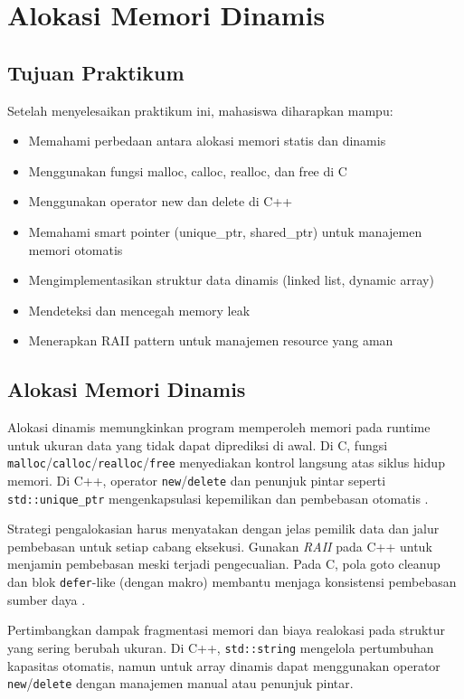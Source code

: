 \documentclass[../main.tex]{subfiles}
\begin{document}
\chapter{Alokasi Memori Dinamis}

\section*{Tujuan Praktikum}
Setelah menyelesaikan praktikum ini, mahasiswa diharapkan mampu:
\begin{itemize}
  \item Memahami perbedaan antara alokasi memori statis dan dinamis
  \item Menggunakan fungsi malloc, calloc, realloc, dan free di C
  \item Menggunakan operator new dan delete di C++
  \item Memahami smart pointer (unique\_ptr, shared\_ptr) untuk manajemen memori otomatis
  \item Mengimplementasikan struktur data dinamis (linked list, dynamic array)
  \item Mendeteksi dan mencegah memory leak
  \item Menerapkan RAII pattern untuk manajemen resource yang aman
\end{itemize}

\section{Alokasi Memori Dinamis}
Alokasi dinamis memungkinkan program memperoleh memori pada runtime untuk ukuran data yang tidak dapat diprediksi di awal. Di C, fungsi \texttt{malloc}/\texttt{calloc}/\texttt{realloc}/\texttt{free} menyediakan kontrol langsung atas siklus hidup memori. Di C++, operator \texttt{new}/\texttt{delete} dan penunjuk pintar seperti \texttt{std::unique\_ptr} mengenkapsulasi kepemilikan dan pembebasan otomatis \parencite{iso-c-draft-n1570,cpp-reference}.

Strategi pengalokasian harus menyatakan dengan jelas pemilik data dan jalur pembebasan untuk setiap cabang eksekusi. Gunakan \emph{RAII} pada C++ untuk menjamin pembebasan meski terjadi pengecualian. Pada C, pola goto cleanup dan blok \texttt{defer}-like (dengan makro) membantu menjaga konsistensi pembebasan sumber daya \parencite{gnu-c-manual}.

Pertimbangkan dampak fragmentasi memori dan biaya realokasi pada struktur yang sering berubah ukuran. Di C++, \texttt{std::string} mengelola pertumbuhan kapasitas otomatis, namun untuk array dinamis dapat menggunakan operator \texttt{new}/\texttt{delete} dengan manajemen manual atau penunjuk pintar.
\end{document}
